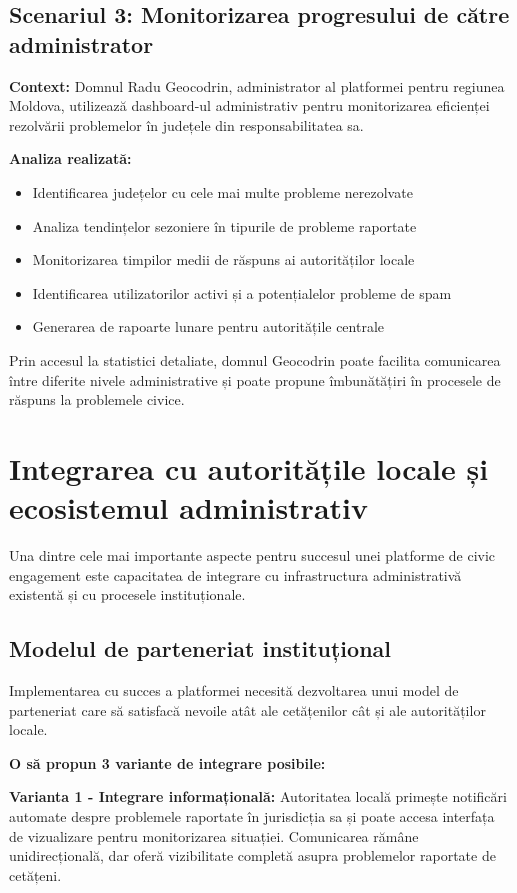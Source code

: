 \documentclass[12pt,a4paper]{report}
\begin{document}
\subsection{Scenariul 3: Monitorizarea progresului de către administrator}

\textbf{Context:} Domnul Radu Geocodrin, administrator al platformei pentru regiunea Moldova, utilizează dashboard-ul administrativ pentru monitorizarea eficienței rezolvării problemelor în județele din responsabilitatea sa.

\textbf{Analiza realizată:}
\begin{itemize}
\item Identificarea județelor cu cele mai multe probleme nerezolvate
\item Analiza tendințelor sezoniere în tipurile de probleme raportate
\item Monitorizarea timpilor medii de răspuns ai autorităților locale
\item Identificarea utilizatorilor activi și a potențialelor probleme de spam
\item Generarea de rapoarte lunare pentru autoritățile centrale
\end{itemize}

Prin accesul la statistici detaliate, domnul  Geocodrin poate facilita comunicarea între diferite nivele administrative și poate propune îmbunătățiri în procesele de răspuns la problemele civice.

\section{Integrarea cu autoritățile locale și ecosistemul administrativ}

Una dintre cele mai importante aspecte pentru succesul unei platforme de civic engagement este capacitatea de integrare cu infrastructura administrativă existentă și cu procesele instituționale.

\subsection{Modelul de parteneriat instituțional}

Implementarea cu succes a platformei necesită dezvoltarea unui model de parteneriat care să satisfacă nevoile atât ale cetățenilor cât și ale autorităților locale.

\textbf{O să propun 3 variante de integrare posibile:}

\textbf{Varianta 1 - Integrare informațională:} Autoritatea locală primește notificări automate despre problemele raportate în jurisdicția sa și poate accesa interfața de vizualizare pentru monitorizarea situației. Comunicarea rămâne unidirecțională, dar oferă vizibilitate completă asupra problemelor raportate de cetățeni.
\end{document}
